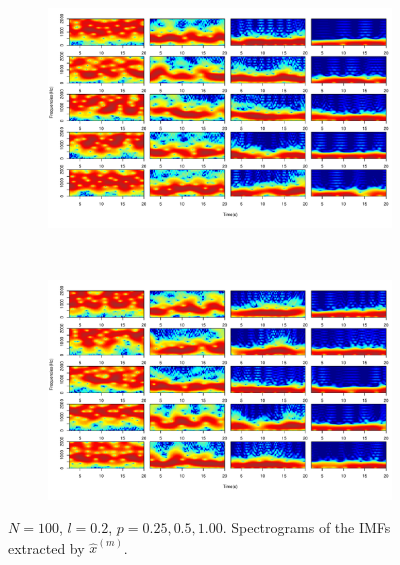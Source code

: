 \documentclass[11pt, a4paper]{article} %
\begin{document}
\begin{figure}
\begin{subfigure}{1.1\textwidth}
  \centering
  \includegraphics[width=\linewidth]{spectro_N100_l020_IMF_1_5.pdf}
  \label{fig:sfig1}
\end{subfigure}\\
\begin{subfigure}{1.1\textwidth}
  \centering
  \includegraphics[width=\linewidth]{spectro_N100_l020_IMF_6_10.pdf}
  \label{fig:sfig2}
\end{subfigure}
\label{fig1}
\caption{$N = 100$, $l = 0.2$, $p = 0.25, 0.5, 1.00$. Spectrograms of the IMFs extracted by $\hat{x}^{(m)}$.}
\end{figure}

\restoregeometry


\end{document}
